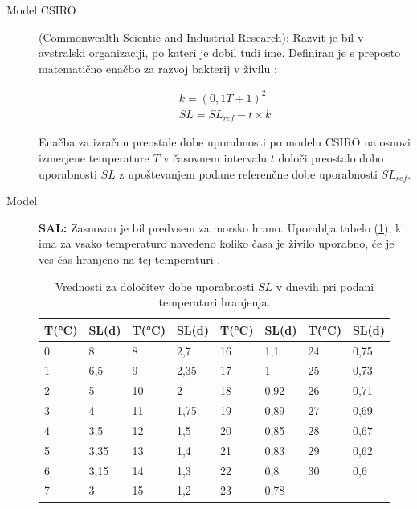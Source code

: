 \documentclass[a4paper, 12pt]{book}
\begin{document}
\begin{description}

	\item[Model CSIRO] (Commonwealth Scientic and Industrial Research): Razvit je bil v avstralski organizaciji, po kateri je dobil tudi ime. Definiran je s preposto matematično enačbo za razvoj bakterij v živilu \cite{magistrska-marolt}:
	
	\begin{align}
		k = (0,1T + 1)^2				\nonumber \\
       	SL = SL_{ref} - t \times k		\nonumber
	\end{align}
	
	Enačba za izračun preostale dobe uporabnosti po modelu CSIRO na osnovi izmerjene temperature $T$ v časovnem intervalu $t$ določi preostalo dobo uporabnosti $SL$ z upoštevanjem podane referenčne dobe uporabnosti $SL_{ref}$.
	
	\item[Model]\textbf{SAL:} Zasnovan je bil predvsem za morsko hrano. Uporablja tabelo (\ref{tab:tabela-sal}), ki ima za vsako temperaturo navedeno koliko časa je živilo uporabno, če je ves čas hranjeno na tej temperaturi \cite{magistrska-marolt}. 

\begin{table}[h]
\begin{center}
\begin{tabular}{ll|ll|ll|ll}
T(°C) & SL(d) & T(°C) & SL(d) & T(°C) & SL(d) & T(°C) & SL(d) \\ \hline
0     & 8     & 8     & 2,7   & 16    & 1,1   & 24    & 0,75  \\
1     & 6,5   & 9     & 2,35  & 17    & 1     & 25    & 0,73  \\
2     & 5     & 10    & 2     & 18    & 0,92  & 26    & 0,71  \\
3     & 4     & 11    & 1,75  & 19    & 0,89  & 27    & 0,69  \\
4     & 3,5   & 12    & 1,5   & 20    & 0,85  & 28    & 0,67  \\
5     & 3,35  & 13    & 1,4   & 21    & 0,83  & 29    & 0,62  \\
6     & 3,15  & 14    & 1,3   & 22    & 0,8   & 30    & 0,6   \\
7     & 3     & 15    & 1,2   & 23    & 0,78  &       &      
\end{tabular}
\caption{Vrednosti za določitev dobe uporabnosti $SL$ v dnevih pri podani temperaturi hranjenja.}
\label{tab:tabela-sal}
\end{center}
\end{table}
	
\end{description}
\end{document}
